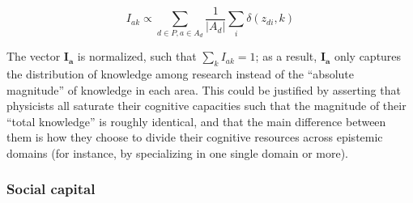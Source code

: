 \documentclass{article}
\begin{document}
\begin{equation}
    I_{ak} \propto  \sum_{d\in P,a\in A_d} \dfrac{1}{|A_d|}\sum_i \delta(z_{di},k)
\end{equation}

The vector $\bm{I_a}$ is normalized, such that $\sum_k I_{ak}=1$; as a result, $\bm{I_a}$ only captures the distribution of knowledge among research instead of the ``absolute magnitude'' of knowledge in each area. This could be justified by asserting that physicists all saturate their cognitive capacities such that the magnitude of their ``total knowledge'' is roughly identical, and that the main difference between them is how they choose to divide their cognitive resources across epistemic domains (for instance, by specializing in one single domain or more).

\subsubsection{Social capital}
\end{document}
